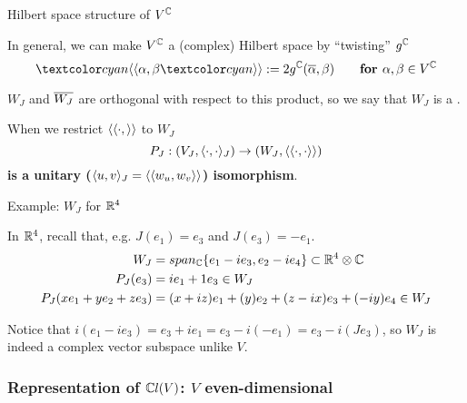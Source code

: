 \begin{frame}{Hilbert space structure of $V^\mathbb C$} %
    
    In general, we can make $V^\mathbb C$ a (complex) Hilbert space by ``twisting'' $g^\mathbb C$ \[ \defn{\bbra} \alpha, \beta \defn{\kket} := 2 g^\CC(\conj{\alpha}, \beta) \qquad \textbf{for } \alpha, \beta \in V^\CC \]
    
    $W_J$ and $\overline{W_J}$ are orthogonal with respect to this product, so we say that $W_J$ is a .
    
    When we restrict $\langle\langle \cdot , \rangle\rangle$ to $W_J$ \[P_J: (V_J, \langle \cdot, \cdot \rangle_J) \to (W_J, \langle\langle \cdot, \cdot \rangle\rangle) \] \textbf{is a unitary ($\langle u, v \rangle_J = \langle\langle w_u, w_v \rangle\rangle$) isomorphism}.
    
\end{frame}

\begin{frame}{Example: $W_J$ for $\mathbb R^4$} %

    In $\mathbb R^4$, recall that, e.g. $J(e_1) = e_3$ and $J(e_3) = -e_1$.
    \begin{align*}
        W_J &= span_\mathbb C\{e_1 -i e_3, e_2 - ie_4\} \subset{\mathbb R^4 \otimes \mathbb C} \\
        P_J(e_3) &= ie_1 + 1e_3 \in W_J \\
        P_J(x e_1 + y e_2 + z e_3) &= (x + iz)e_1 + (y)e_2 + (z - ix)e_3 + (-iy)e_4\in W_J
    \end{align*}
    


Notice that $i(e_1 - i e_3) = e_3 + ie_1 = e_3 - i (-e_1) = e_3 - i (J e_3)$, so $W_J$ is indeed a complex vector subspace unlike $V$.

\end{frame}

\subsubsection{Representation of $\mathbb C l(V)$: $V$ even-dimensional}

